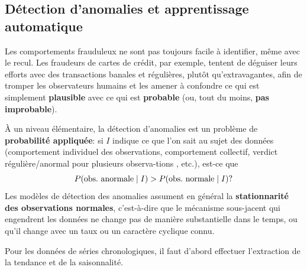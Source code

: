 \subsection{D\'etection d'anomalies et apprentissage automatique}
Les comportements frauduleux ne sont pas toujours facile \`a  identifier, même avec le recul. Les fraudeurs de cartes de crédit, par exemple, tentent de déguiser leurs efforts avec des transactions banales et r\'eguli\`eres, plutôt qu'ex\-tra\-va\-gantes, afin de tromper les observateurs humains et les amener à confondre ce qui est simplement \textbf{plausible} avec ce qui est \textbf{probable} (ou, tout du moins, \textbf{pas improbable}).\par À un niveau élémentaire, la détection d'anomalies est un problème de \textbf{probabilit\'e appliqu\'ee}: si $I$ indique ce que l'on sait au sujet des données (comportement individuel des ob\-ser\-va\-tions, comportement collectif, verdict r\'eguli\`ere/anormal pour plusieurs ob\-ser\-va-tions , etc.), est-ce que  $$P(\text{obs.\@ anormale}\mid I) > P(\text{obs.\@ normale}\mid I)?$$ 
Les modèles de détection des anomalies assument en g\'en\'eral la  \textbf{stationnarité des ob\-ser\-va\-tions normales}, c'est-à-dire que le mécanisme sous-jacent qui engendrent les données ne change pas de manière substantielle dans le temps, ou qu'il change avec un taux ou un caractère cyclique connu. \par Pour les données de séries chronologiques, il faut d'abord effectuer l'extraction de la tendance et de la saisonnalité.
